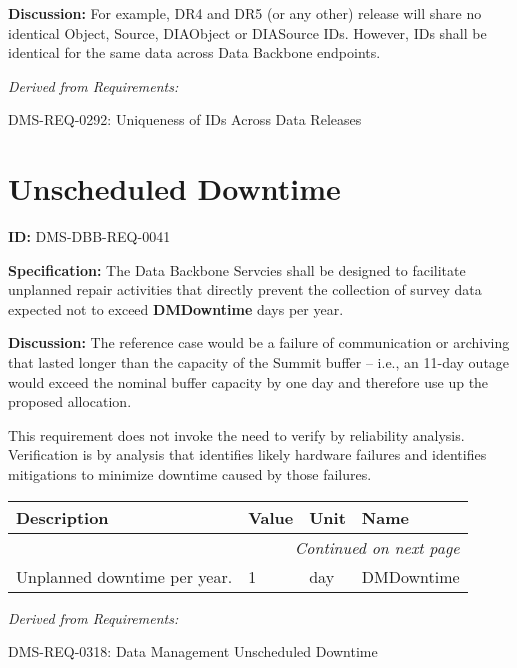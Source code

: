 \documentclass[SE,toc,lsstdraft]{lsstdoc}
\makeatletter
\newcommand{\paramname}[1]{\hspace{0pt}#1}
\newcommand{\unitname}[1]{\hspace{0pt}#1}
\newcommand{\addendum}{}
\newenvironment{parameters}[0]{%
\setlength\LTleft{0pt}
\setlength\LTright{\fill}
\begin{small}
\begin{longtable}[]{|p{0.49\textwidth}|l|p{0.6in}|p{1.70in}@{}|}

\hline \textbf{Description} & \textbf{Value} & \textbf{Unit} & \textbf{Name} \\ \hline
\endhead

\hline \multicolumn{4}{r}{\emph{Continued on next page}} \\
\endfoot

\hline\hline
\endlastfoot
}{%
\hline
\end{longtable}
\end{small}
}
\makeatother
\begin{document}
\textbf{Discussion:}
For example, DR4 and DR5 (or any other) release will share no identical Object, Source, DIAObject or DIASource IDs.    However, IDs shall be identical for the same data across Data Backbone endpoints.

\emph{Derived from Requirements:}

DMS-REQ-0292:
Uniqueness of IDs Across Data Releases \newline

\section{Unscheduled Downtime}

\label{DMS-DBB-REQ-0041}
\textbf{ID:} DMS-DBB-REQ-0041

\textbf{Specification:}
The Data Backbone Servcies shall be designed to facilitate unplanned repair activities that directly prevent the collection of survey data expected not to exceed \textbf{DMDowntime} days per year.

\textbf{Discussion:}
The reference case would be a failure of communication or archiving that lasted longer than the capacity of the Summit buffer -- i.e., an 11-day outage would exceed the nominal buffer capacity by one day and therefore use up the proposed allocation.

This requirement does not invoke the need to verify by reliability analysis. Verification is by analysis that identifies likely hardware failures and identifies mitigations to minimize downtime caused by those failures.

\begin{parameters}
Unplanned downtime per year.
&
1
&
\unitname{%
day
}
&
\paramname{%
DMDowntime
} \\\hline
\end{parameters}

\emph{Derived from Requirements:}

DMS-REQ-0318:
Data Management Unscheduled Downtime \newline

\addendum


\end{document}

